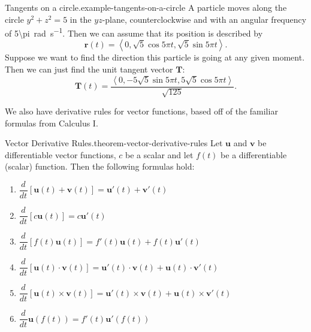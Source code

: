 \documentclass[10pt,]{book}
\numberwithin{equation}{section}
\newcommand{\vv}[1]{\mathbf{#1}}
\newcommand{\dv}[3][]{\dfrac{d^{#1} #2}{d #3^{#1}}}
\newcommand{\dotprod}[1]{\left\langle #1 \right\rangle}
\begin{document}
\begin{example}{Tangents on a circle.}{example-tangents-on-a-circle}%
\hypertarget{p-1270}{}%
A particle moves along the circle \(y^{2}+z^{2}=5\) in the \(yz\)-plane, counterclockwise and with an angular frequency of \SI{5\pi}{\radian\per\second}. Then we can assume that its position is described by%
%
\begin{equation*}
\vv{r}(t) = \dotprod{0,\sqrt{5}\cos5\pi t, \sqrt{5}\sin5\pi t}.
\end{equation*}
\hypertarget{p-1271}{}%
Suppose we want to find the direction this particle is going at any given moment. Then we can just find the unit tangent vector \(\vv{T}\):%
%
\begin{equation*}
\vv{T}(t) = \frac{\dotprod{0,-5\sqrt{5}\sin5\pi t, 5\sqrt{5}\cos5\pi t}}{\sqrt{125}}.
\end{equation*}
\end{example}
\hypertarget{p-1272}{}%
We also have derivative rules for vector functions, based off of the familiar formulas from Calculus I.%
\begin{theorem}{Vector Derivative Rules.}{}{theorem-vector-derivative-rules}%
\hypertarget{p-1273}{}%
Let \(\vv{u}\) and \(\vv{v}\) be differentiable vector functions, \(c\) be a scalar and let \(f(t)\) be a differentiable (scalar) function. Then the following formulas hold:%
\leavevmode%
\begin{enumerate}
\item\hypertarget{li-128}{}\(\dv{}{t}[\vv{u}(t)+\vv{v}(t)] = \vv{u}'(t)+\vv{v}'(t)\)%
\item\hypertarget{li-129}{}\(\dv{}{t}[c\vv{u}(t)] = c\vv{u}'(t)\)%
\item\hypertarget{li-130}{}\(\dv{}{t}[f(t)\vv{u}(t)] = f'(t)\vv{u}(t)+f(t)\vv{u}'(t)\)%
\item\hypertarget{li-131}{}\(\dv{}{t}[\vv{u}(t)\cdot\vv{v}(t)] = \vv{u}'(t)\cdot\vv{v}(t)+\vv{u}(t)\cdot\vv{v}'(t)\)%
\item\hypertarget{li-132}{}\(\dv{}{t}[\vv{u}(t)\times\vv{v}(t)] = \vv{u}'(t)\times\vv{v}(t)+\vv{u}(t)\times\vv{v}'(t)\)%
\item\hypertarget{li-133}{}\(\dv{}{t}\vv{u}(f(t)) = f'(t)\vv{u}'(f(t))\)%
\end{enumerate}
\end{theorem}
%
%
\typeout{************************************************}
\typeout{************************************************}
%
\end{document}
